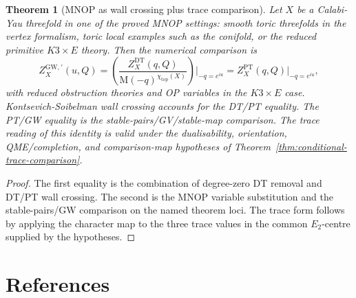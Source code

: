 \documentclass[11pt]{article}
\newtheorem{theorem}{Theorem}
\theoremstyle{definition}
\providecommand{\DT}{\mathrm{DT}}
\providecommand{\GW}{\mathrm{GW}}
\providecommand{\PT}{\mathrm{PT}}
\providecommand{\MM}{\mathrm{M}}
\providecommand{\topc}{\mathrm{top}}
\providecommand{\Etwo}{E_2}
\begin{document}
\begin{theorem}[MNOP as wall crossing plus trace comparison]
\label{thm:final-form}
Let \(X\) be a Calabi-Yau threefold in one of the proved MNOP settings:
smooth toric threefolds in the vertex formalism, toric local examples
such as the conifold, or the reduced primitive \(K3\times E\) theory.
Then the numerical comparison is
\[
  Z_X^{\GW,\prime}(u,Q)
  =
  \left(
  \frac{Z_X^{\DT}(q,Q)}{\MM(-q)^{\chi_{\topc}(X)}}
  \right)\bigg|_{-q=e^{iu}}
  =
  Z_X^{\PT}(q,Q)\big|_{-q=e^{iu}},
\]
with reduced obstruction theories and OP variables in the \(K3\times E\)
case.  Kontsevich-Soibelman wall crossing accounts for the DT/PT
equality.  The PT/GW equality is the stable-pairs/GV/stable-map
comparison.  The trace reading of this identity is valid under the
dualisability, orientation, QME/completion, and comparison-map
hypotheses of Theorem~\ref{thm:conditional-trace-comparison}.
\end{theorem}

\begin{proof}
The first equality is the combination of degree-zero DT removal and
DT/PT wall crossing.  The second is the MNOP variable substitution and
the stable-pairs/GW comparison on the named theorem loci.  The trace
form follows by applying the character map to the three trace values in
the common \(\Etwo\)-centre supplied by the hypotheses.
\end{proof}

\section{References}
\end{document}
